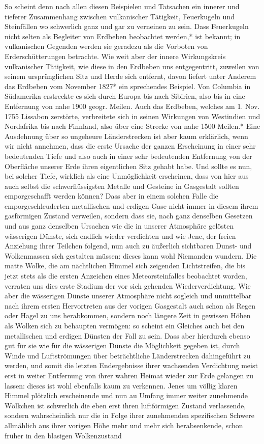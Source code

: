 \documentclass[a4paper, 8pt, oneside, polutonikogreek, german]{article}
\begin{document}
So scheint denn nach allen diesen Beispielen und Tatsachen ein innerer und tieferer Zusammenhang zwischen vulkanischer Tätigkeit, Feuerkugeln und Steinfällen wo schwerlich ganz und gar zu verneinen zu sein. Dass Feuerkugeln nicht selten als Begleiter von Erdbeben beobachtet werden,* ist bekannt; in vulkanischen Gegenden werden sie geradezu als die Vorboten von Erderschütterungen betrachte. Wie weit aber der innere Wirkungskreis vulkanischer Tätigkeit, wie diese in den Erdbeben uns entgegentritt, zuweilen von seinem ursprünglichen Sitz und Herde sich entfernt, davon liefert unter Anderem das Erdbeben vom November 1827* ein sprechendes Beispiel. Von Columbia in Südamerika erstreckte es sich durch Europa bis nach Sibirien, also bis in eine Entfernung von nahe 1900 geogr. Meilen. Auch das Erdbeben, welches am 1. Nov. 1755 Lissabon zerstörte, verbreitete sich in seinen Wirkungen von Westindien und Nordafrika bis nach Finnland, also über eine Strecke von nahe 1500 Meilen.* Eine Ausdehnung über so ungeheure Länderstrecken ist aber kaum erklärlich, wenn wir nicht annehmen, dass die erste Ursache der ganzen Erscheinung in einer sehr bedeutenden Tiefe und also auch in einer sehr bedeutenden Entfernung von der Oberfläche unserer Erde ihren eigentlichen Sitz gehabt habe. Und sollte es nun, bei solcher Tiefe, wirklich als eine Unmöglichkeit erscheinen, dass von hier aus auch selbst die schwerflüssigsten Metalle und Gesteine in Gasgestalt sollten emporgeschafft werden können? Dass aber in einem solchen Falle die emporgeschleuderten metallischen und erdigen Gase nicht immer in diesem ihrem gasförmigen Zustand verweilen, sondern dass sie, nach ganz denselben Gesetzen und aus ganz denselben Ursachen wie die in unserer Atmosphäre gelösten wässerigen Dünste, sich endlich wieder verdichten und wie Jene, der freien Anziehung ihrer Teilchen folgend, nun auch zu äußerlich sichtbaren Dunst- und Wolkenmassen sich gestalten müssen: dieses kann wohl Niemanden wundern. Die matte Wolke, die am nächtlichen Himmel sich zeigenden Lichtstreifen, die bis jetzt stets als die ersten Anzeichen eines Meteorsteinfalles beobachtet worden, verraten uns dies erste Stadium der vor sich gehenden Wiederverdichtung. Wie aber die wässerigen Dünste unserer Atmosphäre nicht sogleich und unmittelbar nach ihrem ersten Hervortreten aus der vorigen Gasgestalt auch schon als Regen oder Hagel zu uns herabkommen, sondern noch längere Zeit in gewissen Höhen als Wolken sich zu behaupten vermögen: so scheint ein Gleiches auch bei den metallischen und erdigen Dünsten der Fall zu sein. Dass aber hierdurch ebenso gut für sie wie für die wässerigen Dünste die Möglichkeit gegeben ist, durch Winde und Luftströmungen über beträchtliche Länderstrecken dahingeführt zu werden, und somit die letzten Endergebnisse ihrer wachsenden Verdichtung meist erst in weiter Entfernung von ihrer wahren Heimat wieder zur Erde gelangen zu lassen: dieses ist wohl ebenfalls kaum zu verkennen. Jenes um völlig klaren Himmel plötzlich erscheinende und nun au Umfang immer weiter zunehmende Wölkchen ist schwerlich die eben erst ihren luftförmigen Zustand verlassende, sondern wahrscheinlich nur die in Folge ihrer zunehmenden spezifischen Schwere allmählich aus ihrer vorigen Höhe mehr und mehr sich herabsenkende, schon früher in den blasigen Wolkenzustand 
\end{document}
